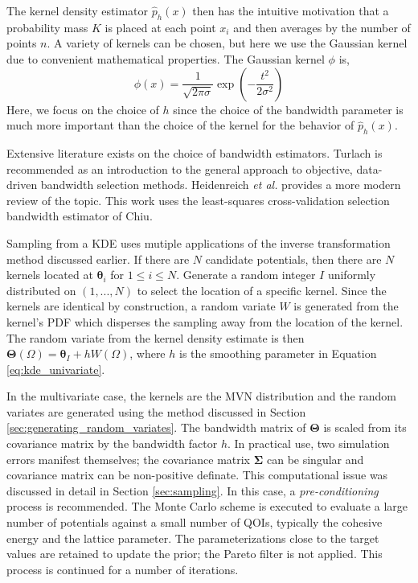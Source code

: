 The kernel density estimator $\hat{p}_h(x)$ then has the intuitive motivation that a probability mass $K$ is placed at each point $x_i$ and then averages by the number of points $n$.  A variety of kernels can be chosen, but here we use the Gaussian kernel due to convenient mathematical properties.  The Gaussian kernel $\phi$ is,
\begin{equation}
  \phi(x)=\frac{1}{\sqrt{2\pi\sigma}}\exp{\left(-\frac{t^2}{2\sigma^2}\right)}
\end{equation}
Here, we focus on the choice of $h$ since the choice of the bandwidth parameter is much more important than the choice of the kernel for the behavior of $\hat{p}_h(x)$\cite{silverman1986_kde}.

Extensive literature exists on the choice of bandwidth estimators.  Turlach\cite{turlach1993_kde_bw} is recommended as an introduction to the general approach to objective, data-driven bandwidth selection methods.  Heidenreich \emph{et al.}\cite{heidenreich2013_kde_bw} provides a more modern review of the topic.  This work uses the least-squares cross-validation selection bandwidth estimator of Chiu\cite{chiu1991_kde_bw}.

Sampling from a KDE uses mutiple applications of the inverse transformation method discussed earlier.  If there are $N$ candidate potentials, then there are $N$ kernels located at $\bm{\theta}_i$ for $1 \leq i \leq N$.  Generate a random integer $I$ uniformly distributed on $(1,...,N)$ to select the location of a specific kernel.  Since the kernels are identical by construction, a random variate $W$ is generated from the kernel's PDF which disperses the sampling away from the location of the kernel.  The random variate from the kernel density estimate is then $\bm{\Theta}(\Omega) = \bm{\theta}_I + h W(\Omega)$, where $h$ is the smoothing parameter in Equation \ref{eq:kde_univariate}.

In the multivariate case, the kernels are the MVN distribution and the random variates are generated using the method discussed in Section \ref{sec:generating_random_variates}.  The bandwidth matrix of $\bm{\Theta}$ is scaled from its covariance matrix by the bandwidth factor $h$.  In practical use, two simulation errors manifest themselves; the covariance matrix $\bm{\Sigma}$ can be singular and covariance matrix can be non-positive definate.  This computational issue was discussed in detail in Section \ref{sec:sampling}.  In this case, a \emph{pre-conditioning} process is recommended.  The Monte Carlo scheme is executed to evaluate a large number of potentials against a small number of QOIs, typically the cohesive energy and the lattice parameter.  The parameterizations close to the target values are retained to update the prior; the Pareto filter is not applied.  This process is continued for a number of iterations.

